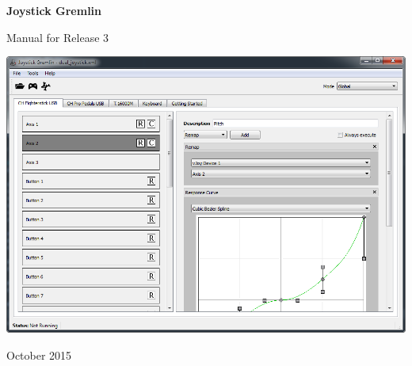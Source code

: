 \begin{titlepage}
\begin{center}
	\vspace*{\fill}
	\vspace*{-3cm}
    \begin{Huge}
        \textbf{Joystick Gremlin}
    \end{Huge}

    \vspace{1cm}

    \begin{Large}
        {Manual for Release 3}
    \end{Large}

    \vspace{3cm}

    \includegraphics[width=0.9\linewidth]{images/main_window_clean}

    \vspace{6.0cm}

	October 2015
\vspace*{\fill}
\end{center}
\end{titlepage}
